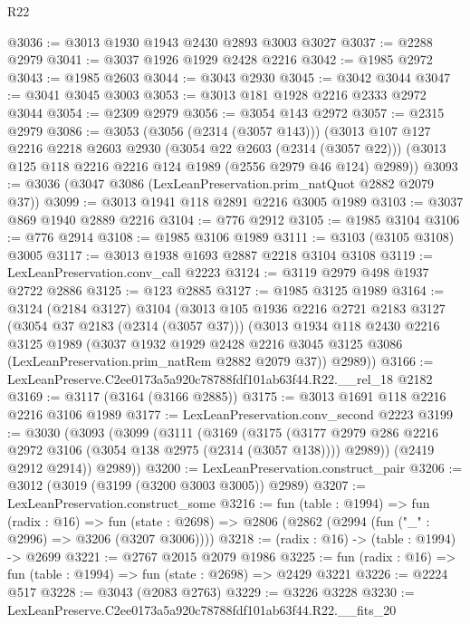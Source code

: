 \begin{lexlean}{R22}
\begin{coremodule}
@3036 := @3013 @1930 @1943 @2430 @2893 @3003 @3027
@3037 := @2288 @2979
@3041 := @3037 @1926 @1929 @2428 @2216
@3042 := @1985 @2972
@3043 := @1985 @2603
@3044 := @3043 @2930
@3045 := @3042 @3044
@3047 := @3041 @3045 @3003
@3053 := @3013 @181 @1928 @2216 @2333 @2972 @3044
@3054 := @2309 @2979
@3056 := @3054 @143 @2972
@3057 := @2315 @2979
@3086 := @3053
    (@3056 (@2314 (@3057 @143)))
    (@3013
      @107
      @127
      @2216
      @2218
      @2603
      @2930
      (@3054 @22 @2603 (@2314 (@3057 @22)))
      (@3013 @125 @118 @2216 @2216 @124 @1989 (@2556 @2979 @46 @124) @2989))
@3093 := @3036 (@3047 @3086 (LexLeanPreservation.prim_natQuot @2882 @2079 @37))
@3099 := @3013 @1941 @118 @2891 @2216 @3005 @1989
@3103 := @3037 @869 @1940 @2889 @2216
@3104 := @776 @2912
@3105 := @1985 @3104
@3106 := @776 @2914
@3108 := @1985 @3106 @1989
@3111 := @3103 (@3105 @3108) @3005
@3117 := @3013 @1938 @1693 @2887 @2218 @3104 @3108
@3119 := LexLeanPreservation.conv_call @2223
@3124 := @3119 @2979 @498 @1937 @2722 @2886
@3125 := @123 @2885
@3127 := @1985 @3125 @1989
@3164 := @3124
    (@2184 @3127)
    @3104
    (@3013
      @105
      @1936
      @2216
      @2721
      @2183
      @3127
      (@3054 @37 @2183 (@2314 (@3057 @37)))
      (@3013
        @1934
        @118
        @2430
        @2216
        @3125
        @1989
        (@3037
          @1932
          @1929
          @2428
          @2216
          @3045
          @3125
          @3086
          (LexLeanPreservation.prim_natRem @2882 @2079 @37))
        @2989))
@3166 := LexLeanPreserve.C2ee0173a5a920c78788fdf101ab63f44.R22.__rel_18 @2182
@3169 := @3117 (@3164 (@3166 @2885))
@3175 := @3013 @1691 @118 @2216 @2216 @3106 @1989
@3177 := LexLeanPreservation.conv_second @2223
@3199 := @3030
    (@3093
      (@3099
        (@3111
          (@3169
            (@3175
              (@3177 @2979 @286 @2216 @2972 @3106 (@3054 @138 @2975 (@2314 (@3057 @138))))
              @2989))
          (@2419 @2912 @2914))
        @2989))
@3200 := LexLeanPreservation.construct_pair
@3206 := @3012 (@3019 (@3199 (@3200 @3003 @3005)) @2989)
@3207 := LexLeanPreservation.construct_some
@3216 := fun (table : @1994) =>
  fun (radix : @16) =>
  fun (state : @2698) => @2806 (@2862 (@2994 (fun ("_" : @2996) => @3206 (@3207 @3006))))
@3218 := (radix : @16) -> (table : @1994) -> @2699
@3221 := @2767 @2015 @2079 @1986
@3225 := fun (radix : @16) => fun (table : @1994) => fun (state : @2698) => @2429 @3221
@3226 := @2224 @517
@3228 := @3043 (@2083 @2763)
@3229 := @3226 @3228
@3230 := LexLeanPreserve.C2ee0173a5a920c78788fdf101ab63f44.R22.__fits_20

\end{coremodule}
\end{lexlean}
